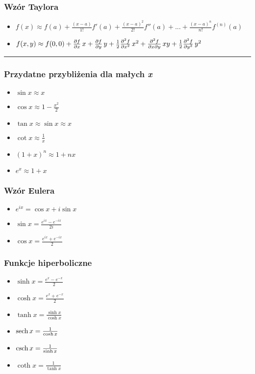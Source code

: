 \documentclass[../main.tex]{subfiles}
\begin{document}
\subsubsection*{Wzór Taylora}
\begin{itemize}
    \item \(f(x)\approx
    f(a)+\frac{(x-a)}{1!}f'(a)+\frac{(x-a)^2}{2!}f''(a)+...+\frac{(x-a)^n}{n!}f^{(n)}(a)\)
    \item \(f(x,y)\approx
    f(0,0)+\pdv{f}{x}\,x+\pdv{f}{y}\,y+\frac{1}{2}\pdv[2]{f}{x}\,x^2+\pdv[2]{f}{x}{y}\,xy+\frac{1}{2}\pdv[2]{f}{y}\,y^2\)
\end{itemize}
\noindent\rule{\textwidth}{.5pt}
\begin{multicols}{2}
\subsubsection*{Przydatne przybliżenia dla małych \textit{x}}
\begin{itemize}
    \item \(\sin x\approx x\)
    \item \(\cos x\approx 1-\frac{x^2}{2}\)
    \item \(\tan x\approx \sin x\approx x\)
    \item \(\cot x\approx\frac{1}{x}\)
    \item \((1+x)^n\approx 1+nx\)
    \item \(e^x\approx 1+x\)
\end{itemize}
\subsubsection*{Wzór Eulera}
\begin{itemize}
    \item \(e^{ix}=\cos x+i\sin x\)
    \item \(\sin x=\frac{e^{ix}-e^{-ix}}{2i}\)
    \item \(\cos x=\frac{e^{ix}+e^{-ix}}{2}\)
\end{itemize}
\subsubsection*{Funkcje hiperboliczne}
\begin{itemize}
    \item \(\sinh x=\frac{e^x-e^{-x}}{2}\)
    \item \(\cosh x=\frac{e^x+e^{-x}}{2}\)
    \item \(\tanh x=\frac{\sinh x}{\cosh x}\)
    \item \(\sech x=\frac{1}{\cosh x}\)
    \item \(\csch x=\frac{1}{\sinh x}\)
    \item \(\coth x=\frac{1}{\tanh x}\)
\end{itemize}

\end{multicols}
\end{document}
